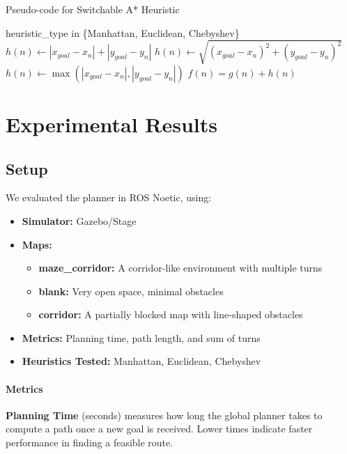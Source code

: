 \documentclass[letterpaper, 10 pt, conference]{ieeeconf}
\begin{document}
\begin{algorithm}[H]
\caption{Pseudo-code for Switchable A* Heuristic}
\label{alg:alg2}
\begin{algorithmic}[1]
\REQUIRE heuristic\_type in \{Manhattan, Euclidean, Chebyshev\}
    \STATE $h(n) \leftarrow |x_{goal} - x_n| + |y_{goal} - y_n|$
    \STATE $h(n) \leftarrow \sqrt{(x_{goal}-x_n)^2 + (y_{goal}-y_n)^2}$
    \STATE $h(n) \leftarrow \max(|x_{goal}-x_n|,|y_{goal}-y_n|)$
\ENDIF
\RETURN $f(n) = g(n) + h(n)$
\end{algorithmic}
\end{algorithm}


\section{Experimental Results}\label{sec:experiments}
\subsection{Setup}
We evaluated the planner in ROS Noetic, using:
\begin{itemize}
    \item \textbf{Simulator:} Gazebo/Stage
    \item \textbf{Maps:} 
    \begin{itemize}
        \item \textbf{maze\_corridor:} A corridor-like environment with multiple turns
        \item \textbf{blank:} Very open space, minimal obstacles
        \item \textbf{corridor:} A partially blocked map with line-shaped obstacles
    \end{itemize}
    \item \textbf{Metrics:} Planning time, path length, and sum of turns
    \item \textbf{Heuristics Tested:} Manhattan, Euclidean, Chebyshev
\end{itemize}

\paragraph*{Metrics}
\textbf{Planning Time} (seconds) measures how long the global planner takes to compute a path once a new goal is received. Lower times indicate faster performance in finding a feasible route. 
\end{document}
